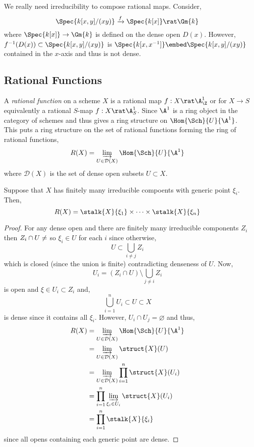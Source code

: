 \documentclass[12pt]{article}
\begin{document}
\begin{remark}
We really need irreducibility to compose rational maps. Consider,
\[ \Spec{k[x,y]/(xy)} \xrightarrow{f} \Spec{k[x]} \rat \Gm{k} \]
where $\Spec{k[x]} \to \Gm{k}$ is defined on the dense open $D(x)$. However, $f^{-1}(D(x)) \subset \Spec{k[x,y]/(xy)}$ is $\Spec{k[x, x^{-1}]} \embed \Spec{k[x,y]/(xy)}$ contained in the $x$-axis and thus is not dense.
\end{remark}

\subsection{Rational Functions}

\begin{definition}
A \textit{rational function} on a scheme $X$ is a rational map $f : X \rat \A^1_\Z$ or for $X \to S$ equivalently a rational $S$-map $f : X \rat \A^1_S$. Since $\A^1$ is a ring object in the category of schemes and thus gives a ring structure on $\Hom{\Sch}{U}{\A^1}$. This puts a ring structure on the set of rational functions forming the ring of rational functions,
\[ R(X) = \varinjlim_{U \in \mathcal{D}(X)} \Hom{\Sch}{U}{\A^1} \]
where $\mathcal{D}(X)$ is the set of dense open subsets $U \subset X$.
\end{definition}

\begin{prop}
Suppose that $X$ has finitely many irreducible compoents with generic point $\xi_i$. Then,
\[ R(X) = \stalk{X}{\xi_1} \times \cdots \times \stalk{X}{\xi_n} \]
\end{prop}

\begin{proof}
For any dense open and there are finitely many irreducible components $Z_i$ then $Z_i \cap U \neq \empty$ so $\xi_i \in U$ for each $i$ since otherwise,
\[ U \subset \bigcup_{i \neq j} Z_i \]
which is closed (since the union is finite) contradicting denseness of $U$. Now,
\[ U_i = (Z_i \cap U) \setminus \bigcup_{j \neq i} Z_i \]
is open and $\xi \in U_i \subset Z_i$ and,
\[ \bigcup_{i = 1}^n U_i \subset U \subset X \]
is dense since it contains all $\xi_i$. However, $U_i \cap U_j = \varnothing$ and thus,
\begin{align*}
R(X) & = \varinjlim_{U \in \mathcal{D}(X)} \Hom{\Sch}{U}{\A^1}
\\
& = \varinjlim_{U \in \mathcal{D}(X)} \struct{X}(U)
\\
& = \varinjlim_{U \in \mathcal{D}(X)} \prod_{i = 1}^n \struct{X}(U_i)
\\
& = \prod_{i = 1}^n \varinjlim_{\xi_i \in U_i} \struct{X}(U_i)
\\
& = \prod_{i = 1}^n \stalk{X}{\xi_i} 
\end{align*}
since all opens containing each generic point are dense.
\end{proof}
\end{document}
